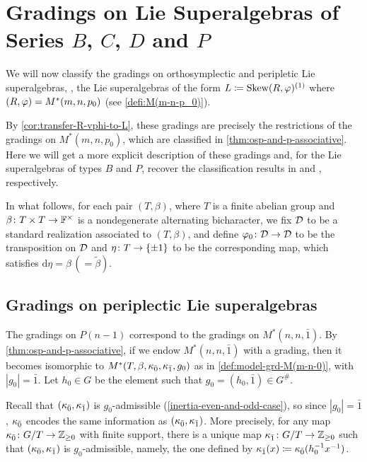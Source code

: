 
\section[Gradings on Lie Superalgebras of Series \texorpdfstring{$B$, $C$, $D$ and $P$}{B, C, D and P}]{Gradings on Lie Superalgebras of Series $B$, $C$, $D$ and $P$}

We will now classify the gradings on orthosymplectic and peripletic Lie superalgebras, \ie, the Lie superalgebras of the form $L \coloneqq \operatorname{Skew}(R, \varphi)^{(1)}$ where $(R, \varphi) = M^*(m,n, p_0)$ (see \cref{defi:M(m-n-p_0)}). 

By \cref{cor:transfer-R-vphi-to-L}, these gradings are precisely the restrictions of the gradings on $M^*(m,n, p_0)$, which are classified in \cref{thm:osp-and-p-associative}. 
Here we will get a more explicit description of these gradings and, for the Lie superalgebras of types $B$ and $P$, recover the classification results in \cite{Helens_thesis} and \cite{paper-MAP}, respectively. 

In what follows, for each pair $(T, \beta)$, where $T$ is a finite abelian group and $\beta\colon {T\times T} \to \mathbb{F}^\times$ is a nondegenerate alternating bicharacter, we fix $\mathcal{D}$ to be a standard realization associated to $(T, \beta)$, and define $\varphi_0\colon \mathcal{D} \to \mathcal{D}$ to be the transposition on $\mathcal{D}$ and $\eta\colon T \to \{\pm 1\}$ to be the corresponding map, which satisfies $\mathrm{d}\eta = \beta \, (= \tilde\beta)$. 

\subsection{Gradings on periplectic Lie superalgebras}\label{ssec:grds-P(n)}

The gradings on $P(n-1)$ correspond to the gradings on $M^*(n, n, \bar 1)$. 
By \cref{thm:osp-and-p-associative}, if we endow $M^*(n, n, \bar 1)$ with a grading, then it becomes isomorphic to $M^*(T, \beta, \kappa_{\bar{0}}, \kappa_{\bar{1}}, g_0)$ as in \cref{def:model-grd-M(m-n-0)}, with $|g_0| = \bar 1$. 
Let $h_0 \in G$ be the element such that $g_0 = (h_0, \bar 1) \in G^\#$. 

Recall that $(\kappa_{\bar{0}}, \kappa_{\bar{1}})$ is $g_0$-admissible (\cref{inertia-even-and-odd-case}), so since $|g_0| = \bar 1$, $\kappa_{\bar{0}}$ encodes the same information as $(\kappa_{\bar{0}}, \kappa_{\bar{1}})$. 
More precisely, for any map $\kappa_{\bar{0}}\colon G/T \to \mathbb{Z}_{\geq 0}$ with finite support, there is a unique map $\kappa_{\bar{1}}\colon G/T \to \mathbb{Z}_{\geq 0}$ such that $(\kappa_{\bar{0}}, \kappa_{\bar{1}})$ is $g_0$-admissible, namely, the one defined by $\kappa_{\bar{1}} (x) \coloneqq \kappa_{\bar{0}} (h_0^{-1} x^{-1})$. 

